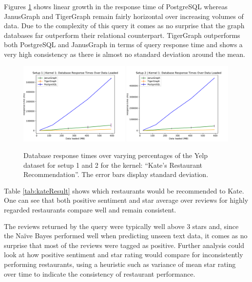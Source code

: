 Figures \ref{fig:katePerfResults} shows linear growth in the response time of PostgreSQL whereas JanusGraph and TigerGraph remain fairly horizontal over increasing volumes of data. Due to the complexity of this query it comes as no surprise that the graph databases far outperform their relational counterpart. TigerGraph outperforms both PostgreSQL and JanusGraph in terms of query response time and shows a very high consistency as there is almost no standard deviation around the mean.

\begin{figure}[h]
    \centering
    \includegraphics[width=0.49\textwidth]{img/7_yelpPerfResults/katePlotSetup1.pdf}
    \includegraphics[width=0.49\textwidth]{img/7_yelpPerfResults/katePlotSetup2.pdf}
    \caption{Database response times over varying percentages of the Yelp dataset for setup 1 and 2 for the kernel: ``Kate's Restaurant Recommendation''. The error bars display standard deviation.}
    \label{fig:katePerfResults}
\end{figure}

Table \ref{tab:kateResult} shows which restaurants would be recommended to Kate. One can see that both positive sentiment and star average over reviews for highly regarded restaurants compare well and remain consistent.

The reviews returned by the query were typically well above 3 stars and, since the Na\"ive Bayes performed well when predicting unseen text data, it comes as no surprise that most of the reviews were tagged as positive. Further analysis could look at how positive sentiment and star rating would compare for inconsistently performing restaurants, using a heuristic such as variance of mean star rating over time to indicate the consistency of restaurant performance. %

